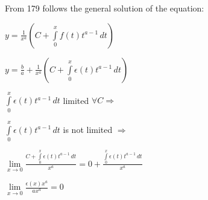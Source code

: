 \documentclass{article}
\begin{document}
From 179 follows the general solution of the equation:
\begin{left}
\begin{spacing}{3}
$\displaystyle y= \frac{1}{x^a} (C+\int\limits _0^x f(t)t^{a-1}\,dt)$

$\displaystyle y= \frac{b}{a}+\frac{1}{x^a} (C+\int\limits _0^x \epsilon(t)t^{a-1}\,dt)$

$\displaystyle \int\limits _0^x \epsilon(t)t^{a-1}\,dt$  limited $\forall C \Rightarrow$ 

$\displaystyle \int\limits _0^x \epsilon(t)t^{a-1}\,dt$  is not limited $\Rightarrow$

$\displaystyle \lim\limits_{x \to 0}\frac{C+\int\limits _0^x \epsilon(t)t^{a-1}\,dt}{x^a}=0+\frac{\int\limits _0^x \epsilon(t)t^{a-1}\,dt}{x^a}$

$\displaystyle \lim\limits_{x \to 0}\frac{\epsilon(x)x^a}{ax^a}=0$

\end{spacing}
\end{left}
\end{document}
